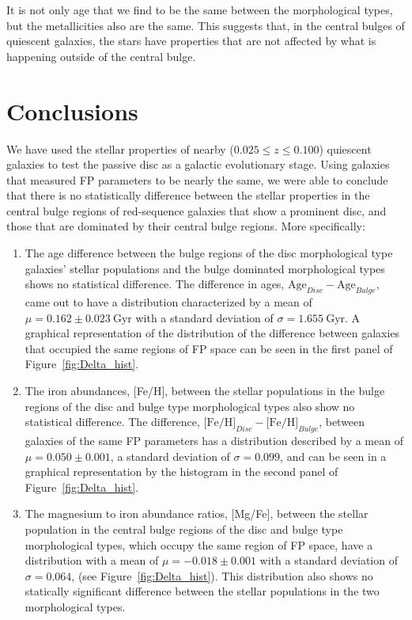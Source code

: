 \documentclass[showcase, preprintnumbers, amsmath, amssymb, bibnotes, 12pt]{revtex4}
\begin{document}
It is not only age that we find to be the same between the morphological types, but the metallicities also are the same. This suggests that, in the central bulges of quiescent galaxies, the stars have properties that are not affected by what is happening outside of the central bulge.  

\section{Conclusions}

We have used the stellar properties of nearby ($0.025 \leq z \leq 0.100$) quiescent galaxies to test the passive disc as a galactic evolutionary stage. Using galaxies that measured FP parameters to be nearly the same, we were able to conclude that there is no statistically difference between the stellar properties in the central bulge regions of red-sequence galaxies that show a prominent disc, and those that are dominated by their central bulge regions. More specifically:

\begin{enumerate}
\item The age difference between the bulge regions of the disc morphological type galaxies' stellar populations and the bulge dominated morphological types shows no statistical difference. The difference in ages, $\text{Age}_{Disc}-\text{Age}_{Bulge}$, came out to have a distribution characterized by a mean of $\mu=0.162\pm0.023\ \text{Gyr}$ with a standard deviation of $\sigma=1.655\ \text{Gyr}$. A graphical representation of the distribution of the difference between galaxies that occupied the same regions of FP space can be seen in the first panel of Figure~\ref{fig:Delta_hist}.
\item The iron abundances, [Fe/H], between the stellar populations in the bulge regions of the disc and bulge type morphological types also show no statistical difference. The difference, $\text{[Fe/H]}_{Disc}-\text{[Fe/H]}_{Bulge}$, between galaxies of the same FP parameters has a distribution described by a mean of $\mu=0.050\pm0.001$, a standard deviation of $\sigma=0.099$, and can be seen in a graphical representation by the histogram in the second panel of Figure~\ref{fig:Delta_hist}.
\item The magnesium to iron abundance ratios, [Mg/Fe], between the stellar population in the central bulge regions of the disc and bulge type morphological types, which occupy the same region of FP space, have a distribution with a mean of $\mu=-0.018\pm0.001$ with a standard deviation of $\sigma=0.064$, (see Figure~\ref{fig:Delta_hist}). This distribution also shows no statically significant difference between the stellar populations in the two morphological types.
\end{enumerate}
\end{document}
